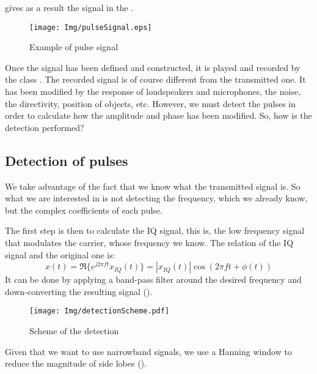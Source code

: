 gives as a result the signal in the .

\begin{figure}[h]
	\centering
	\texttt{[image: Img/pulseSignal.eps]}
	\caption[Pulse Signal]{Example of pulse signal}
	\label{examplePulseSignal}
\end{figure}


Once the signal has been defined and constructed, it is played and recorded by the class . The recorded signal is of course different from the transmitted one. It has been modified by the response of loudspeakers and microphones, the noise, the directivity, position of objects, etc. However, we must detect the pulses in order to calculate how the amplitude and phase has been modified. So, how is the detection performed?

\subsection{Detection of pulses}
We take advantage of the fact that we know what the transmitted signal is. So what we are interested in is not detecting the frequency, which we already know, but the complex coefficients of each pulse.

The first step is then to calculate the IQ signal, this is, the low frequency signal that modulates the carrier, whose frequency we know. The relation of the IQ signal and the original one is:
\begin{equation}
x(t) = \Re\{ e^{j 2 \pi f t} x_{IQ}(t) \} = |x_{IQ}(t)| \cos(2 \pi f t + \phi(t))
\label{IQcondition}
\end{equation}
It can be done by applying a band-pass filter around the desired frequency and down-converting the resulting signal ().
\begin{figure}[h]
	\centering
	\texttt{[image: Img/detectionScheme.pdf]}
	\caption[Detection Scheme]{Scheme of the detection}
	\label{detectionScheme}
\end{figure}

Given that we want to use narrowband signals, we use a Hanning window to reduce the magnitude of side lobes ().

